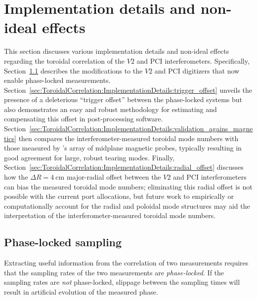 \section{Implementation details and non-ideal effects}
\label{sec:ToroidalCorrelation:ImplementationDetails}
This section discusses various implementation details and non-ideal effects
regarding the toroidal correlation of the $V2$ and PCI interferometers.
Specifically, Section~\ref{sec:ToroidalCorrelation:ImplementationDetails:phase_locked_sampling}
describes the modifications to the $V2$ and PCI digitizers
that now enable phase-locked measurements.
Section~\ref{sec:ToroidalCorrelation:ImplementationDetails:trigger_offset}
unveils the presence of a deleterious ``trigger offset''
between the phase-locked systems but
also demonstrates an easy and robust methodology
for estimating and compensating this offset
in post-processing software.
Section~\ref{sec:ToroidalCorrelation:ImplementationDetails:validation_agains_magnetics}
then compares the interferometer-measured toroidal mode numbers
with those measured by \diiid's array of midplane magnetic probes,
typically resulting in good agreement for large, robust tearing modes.
Finally, Section~\ref{sec:ToroidalCorrelation:ImplementationDetails:radial_offset}
discusses how the $\Delta R = \SI{4}{\centi\meter}$ major-radial offset
between the $V2$ and PCI interferometers
can bias the measured toroidal mode numbers;
eliminating this radial offset is not possible
with the current port allocations, but
future work to empirically or computationally account
for the radial and poloidal mode structures
may aid the interpretation
of the interferometer-measured toroidal mode numbers.


\subsection{Phase-locked sampling}
\label{sec:ToroidalCorrelation:ImplementationDetails:phase_locked_sampling}
Extracting useful information
from the correlation of two measurements
requires that the sampling rates of the two measurements
are \emph{phase-locked}.
If the sampling rates are \emph{not} phase-locked,
slippage between the sampling times
will result in artificial evolution of the measured phase.

